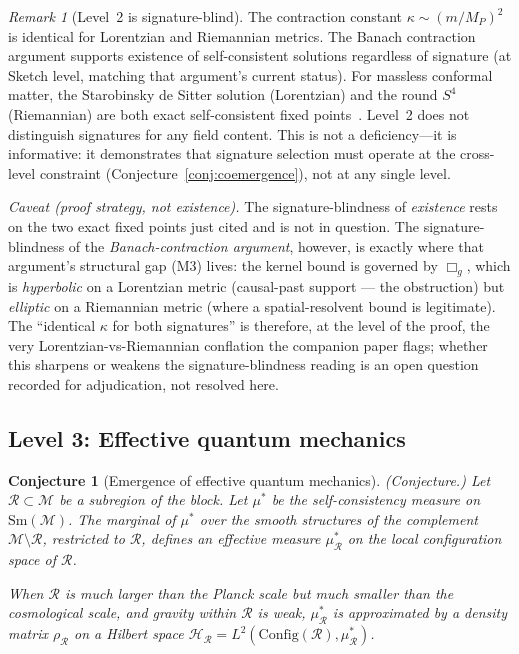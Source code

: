 \documentclass[12pt,a4paper]{article}
\newtheorem{conjecture}{Conjecture}
\theoremstyle{definition}
\theoremstyle{remark}
\newtheorem{remark}{Remark}
\begin{document}
\begin{remark}[Level~2 is signature-blind]
\label{rem:signature_blind}
The contraction constant $\kappa \sim (m/M_P)^2$ is identical for
Lorentzian and Riemannian metrics. The Banach contraction argument
supports existence of self-consistent solutions regardless of signature
(at Sketch level, matching that argument's current status). For
massless conformal matter, the Starobinsky de Sitter solution
(Lorentzian) and the round $S^4$ (Riemannian) are both exact
self-consistent fixed points~\cite{starobinsky,bunch_davies}. Level~2
does not distinguish signatures for any field content. This is not a
deficiency---it is informative: it demonstrates that signature selection
must operate at the cross-level constraint
(Conjecture~\ref{conj:coemergence}), not at any single level.

\emph{Caveat (proof strategy, not existence).} The signature-blindness of
\emph{existence} rests on the two exact fixed points just cited and is not in
question. The signature-blindness of the \emph{Banach-contraction argument},
however, is exactly where that argument's structural gap (M3) lives: the kernel
bound is governed by $\Box_g$, which is \emph{hyperbolic} on a Lorentzian metric
(causal-past support --- the obstruction) but \emph{elliptic} on a Riemannian
metric (where a spatial-resolvent bound is legitimate). The ``identical $\kappa$
for both signatures'' is therefore, at the level of the proof, the very
Lorentzian-vs-Riemannian conflation the companion paper flags; whether this
sharpens or weakens the signature-blindness reading is an open question recorded
for adjudication, not resolved here.
\end{remark}

\subsection{Level 3: Effective quantum mechanics}
\label{sec:level3}

\begin{conjecture}[Emergence of effective quantum mechanics]
\emph{(Conjecture.)}
\label{conj:qm}
Let $\mathcal{R} \subset \mathcal{M}$ be a subregion of the block. Let
$\mu^*$ be the self-consistency measure on $\mathrm{Sm}(\mathcal{M})$.
The marginal of $\mu^*$ over the smooth structures of the complement
$\mathcal{M} \setminus \mathcal{R}$, restricted to $\mathcal{R}$, defines
an effective measure $\mu^*_\mathcal{R}$ on the local configuration space
of $\mathcal{R}$.

When $\mathcal{R}$ is much larger than the Planck scale but much smaller
than the cosmological scale, and gravity within $\mathcal{R}$ is weak,
$\mu^*_\mathcal{R}$ is approximated by a density matrix
$\rho_\mathcal{R}$ on a Hilbert space $\mathcal{H}_\mathcal{R} =
L^2(\mathrm{Config}(\mathcal{R}), \mu^*_\mathcal{R})$.
\end{conjecture}
\end{document}
